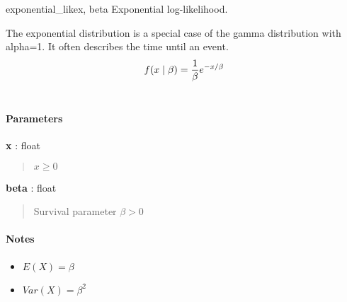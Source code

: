 \hypertarget{pymc.distributions.exponential_like}{}
\begin{funcdesc}{exponential\_like}{x, beta}
Exponential log-likelihood.

The exponential distribution is a special case of the gamma distribution
with alpha=1. It often describes the time until an event.
\begin{gather}
\begin{split}f(x \mid \beta) = \frac{1}{\beta}e^{-x/\beta}\end{split}\notag\\\begin{split}\end{split}\notag
\end{gather}
\paragraph{Parameters}
\begin{paramlist}
\item[] \textbf{x} : float
\begin{quote}

$x \ge 0$
\end{quote}

\item[] \textbf{beta} : float
\begin{quote}

Survival parameter $\beta > 0$
\end{quote}
\end{paramlist}
\paragraph{Notes}
\begin{itemize}
\item {} 
$E(X) = \beta$

\item {} 
$Var(X) = \beta^2$

\end{itemize}
\end{funcdesc}

